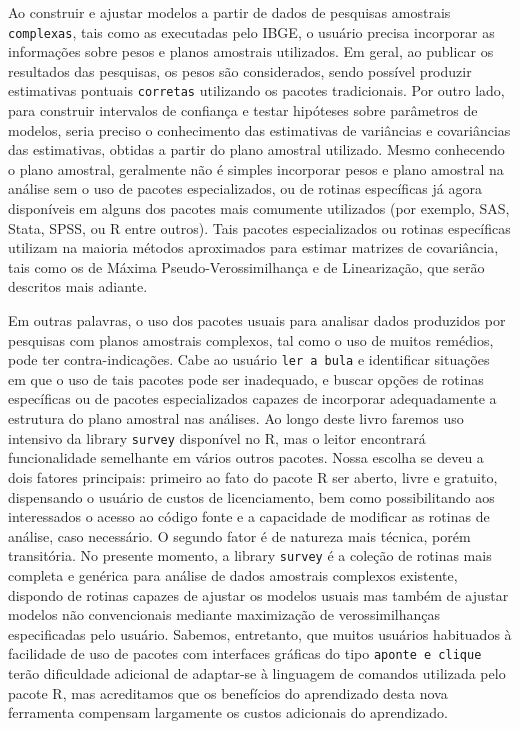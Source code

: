 \documentclass[]{book}
\theoremstyle{definition}
\theoremstyle{definition}
\theoremstyle{definition}
\theoremstyle{remark}
\begin{document}
Ao construir e ajustar modelos a partir de dados de pesquisas amostrais
\texttt{complexas}, tais como as executadas pelo IBGE, o usuário precisa
incorporar as informações sobre pesos e planos amostrais utilizados. Em
geral, ao publicar os resultados das pesquisas, os pesos são
considerados, sendo possível produzir estimativas pontuais
\texttt{corretas} utilizando os pacotes tradicionais. Por outro lado,
para construir intervalos de confiança e testar hipóteses sobre
parâmetros de modelos, seria preciso o conhecimento das estimativas de
variâncias e covariâncias das estimativas, obtidas a partir do plano
amostral utilizado. Mesmo conhecendo o plano amostral, geralmente não é
simples incorporar pesos e plano amostral na análise sem o uso de
pacotes especializados, ou de rotinas específicas já agora disponíveis
em alguns dos pacotes mais comumente utilizados (por exemplo, SAS,
Stata, SPSS, ou R entre outros). Tais pacotes especializados ou rotinas
específicas utilizam na maioria métodos aproximados para estimar
matrizes de covariância, tais como os de Máxima Pseudo-Verossimilhança e
de Linearização, que serão descritos mais adiante.

Em outras palavras, o uso dos pacotes usuais para analisar dados
produzidos por pesquisas com planos amostrais complexos, tal como o uso
de muitos remédios, pode ter contra-indicações. Cabe ao usuário
\texttt{ler\ a\ bula} e identificar situações em que o uso de tais
pacotes pode ser inadequado, e buscar opções de rotinas específicas ou
de pacotes especializados capazes de incorporar adequadamente a
estrutura do plano amostral nas análises. Ao longo deste livro faremos
uso intensivo da library \texttt{survey} disponível no R, mas o leitor
encontrará funcionalidade semelhante em vários outros pacotes. Nossa
escolha se deveu a dois fatores principais: primeiro ao fato do pacote R
ser aberto, livre e gratuito, dispensando o usuário de custos de
licenciamento, bem como possibilitando aos interessados o acesso ao
código fonte e a capacidade de modificar as rotinas de análise, caso
necessário. O segundo fator é de natureza mais técnica, porém
transitória. No presente momento, a library \texttt{survey} é a coleção
de rotinas mais completa e genérica para análise de dados amostrais
complexos existente, dispondo de rotinas capazes de ajustar os modelos
usuais mas também de ajustar modelos não convencionais mediante
maximização de verossimilhanças especificadas pelo usuário. Sabemos,
entretanto, que muitos usuários habituados à facilidade de uso de
pacotes com interfaces gráficas do tipo \texttt{aponte\ e\ clique} terão
dificuldade adicional de adaptar-se à linguagem de comandos utilizada
pelo pacote R, mas acreditamos que os benefícios do aprendizado desta
nova ferramenta compensam largamente os custos adicionais do
aprendizado.
\end{document}
